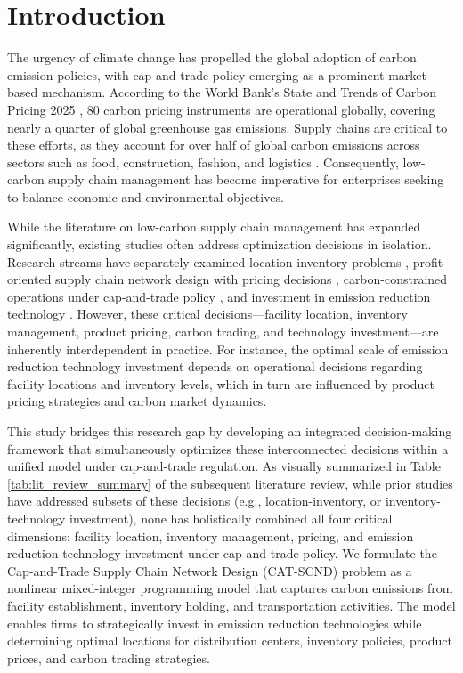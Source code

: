 \documentclass[]{article}
\theoremstyle{plain}%
\theoremstyle{definition}
\theoremstyle{remark}
\theoremstyle{plain}%
\begin{document}
    \section{Introduction}
The urgency of climate change has propelled the global adoption of carbon emission policies, 
with cap-and-trade policy emerging as a prominent market-based mechanism. According to the World Bank's State and Trends of Carbon Pricing 2025 \citep{worldbank2025carbon}, 80 carbon pricing instruments are operational globally, covering nearly a quarter of global greenhouse gas emissions. Supply chains are critical to these efforts, as they account for over half of global carbon emissions across sectors such as food, construction, fashion, and logistics \citep{weforum2021netzero}. Consequently, low-carbon supply chain management has become imperative for enterprises seeking to balance economic and environmental objectives.

While the literature on low-carbon supply chain management has expanded significantly, existing studies often address optimization decisions in isolation. Research streams have separately examined location-inventory problems \citep{shen2003joint}, profit-oriented supply chain network design with pricing decisions \citep{shen2006profit}, carbon-constrained operations under cap-and-trade policy \citep{benjaafar2013carbon}, and investment in emission reduction technology \citep{toptal2014joint}. However, these critical decisions—facility location, inventory management, product pricing, carbon trading, and technology investment—are inherently interdependent in practice. For instance, the optimal scale of emission reduction technology investment depends on operational decisions regarding facility locations and inventory levels, which in turn are influenced by product pricing strategies and carbon market dynamics.

This study bridges this research gap by developing an integrated decision-making framework that simultaneously optimizes these interconnected decisions within a unified model under cap-and-trade regulation. As visually summarized in Table \ref{tab:lit_review_summary} of the subsequent literature review, while prior studies have addressed subsets of these decisions (e.g., location-inventory, or inventory-technology investment), none has holistically combined all four critical dimensions: facility location, inventory management, pricing, and emission reduction technology investment under cap-and-trade policy. We formulate the Cap-and-Trade Supply Chain Network Design (CAT-SCND) problem as a nonlinear mixed-integer programming model that captures carbon emissions from facility establishment, inventory holding, and transportation activities. The model enables firms to strategically invest in emission reduction technologies while determining optimal locations for distribution centers, inventory policies, product prices, and carbon trading strategies.
\end{document}
